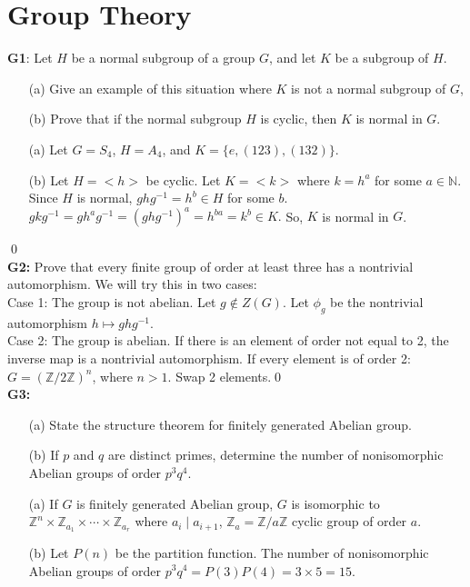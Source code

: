 \chapter{Group Theory}
\textbf{G1}: Let $ H $ be a normal subgroup of a group $ G $, and let $ K $ be a subgroup of $ H $.
\begin{itemize}
	\item[(a)] Give an example of this situation where $ K $ is not a normal subgroup of $ G $,
	\item[(b)] Prove that if the normal subgroup $ H $ is cyclic, then $ K $ is normal in $ G $. 
\end{itemize}
\soln
\begin{itemize}
	\item[(a)] Let $ G=S_4 $, $ H=A_4 $, and $ K= \{e,(123),(132)\} $.
	\item[(b)] Let $ H = <h>$ be cyclic. Let $ K= <k> $ where $ k=h^a $ for some $ a\in \mathbb{N} $.\\
	Since $ H $ is normal, $ ghg^{-1}=h^b \in H$ for some $ b $.\\
	$ gkg^{-1}= gh^a g^{-1}= (ghg^{-1})^a= h^{ba}=k^b\in K.$ So, $ K $ is normal in $ G $.
\end{itemize}
\qed\\
\textbf{G2:} Prove that every finite group of order at least three has a nontrivial automorphism. 
\soln We will try this in two cases:\\
Case 1: The group is not abelian. Let $ g\notin Z(G) $. Let $\phi_g $ be the nontrivial automorphism $ h\mapsto ghg^{-1} $.\\
Case 2: The group is abelian. If there is an element of order not equal to 2, the inverse map is a nontrivial automorphism. If every element is of order 2: $ G= (\mathbb{Z}/2\mathbb{Z})^n $, where $ n>1 $. Swap 2 elements.\qed\\
\textbf{G3:}
\begin{itemize}
	\item[(a)] State the structure theorem for finitely generated Abelian group.
	\item[(b)] If $ p $ and $ q $ are distinct primes, determine the number of nonisomorphic Abelian groups of order $ p^3q^4 $.
\end{itemize}
\soln
\begin{itemize}
	\item[(a)] If $ G $ is finitely generated Abelian group, $ G $ is isomorphic to $ \mathbb{Z}^n \times \mathbb{Z}_{a_1}\times \cdots \times \mathbb{Z}_{a_r}$ where $ a_i\mid a_{i+1} $, $ \mathbb{Z}_a = \mathbb{Z}/a\mathbb{Z}$ cyclic group of order $ a $. 
	\item[(b)] Let $ P(n) $ be the partition function. The number of nonisomorphic Abelian groups of order $ p^3q^4 = P(3)P(4)=3\times 5 = 15$.
\end{itemize}
